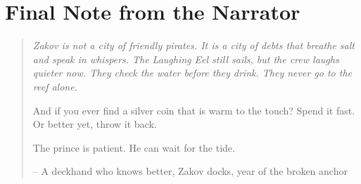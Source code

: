 \documentclass[12pt]{article}
\newenvironment{quoteBox}
  {\begin{quote}\itshape}
  {\end{quote}}
\begin{document}
\section*{Final Note from the Narrator}
\begin{quoteBox}
Zakov is not a city of friendly pirates. It is a city of debts that breathe salt and speak in whispers. The \textit{Laughing Eel} still sails, but the crew laughs quieter now. They check the water before they drink. They never go to the reef alone.

And if you ever find a silver coin that is warm to the touch? Spend it fast. Or better yet, throw it back.

The prince is patient. He can wait for the tide.

– A deckhand who knows better, Zakov docks, year of the broken anchor
\end{quoteBox}
\end{document}
